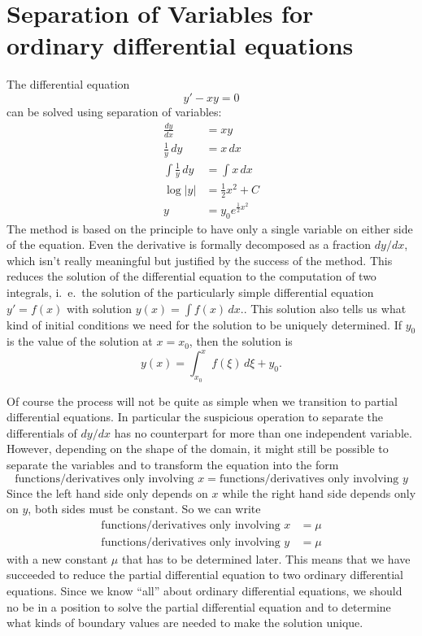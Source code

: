 %
%
%
\section{Separation of Variables for ordinary differential equations}
The differential equation
\begin{equation}
y'-xy=0
\label{separation:ode}
\end{equation}
can be solved using separation of variables:
\begin{align*}
\frac{dy}{dx}&=xy\\
\frac1y\,dy&=x\,dx\\
\int\frac1y\,dy&=\int x\,dx\\
\log|y|&=\frac12x^2+C\\
y&=y_0e^{\frac12x^2}
\end{align*}
The method is based on the principle to have only a single variable
on either side of the equation.
Even the derivative is formally decomposed as a fraction $dy/dx$, which
isn't really meaningful but justified by the success of the method.
This reduces the solution of the differential equation to the computation
of two integrals, i.~e.~the solution of the particularly simple
differential equation $y'=f(x)$ with solution $y(x)=\int f(x)\,dx$..
This solution also tells us what kind of initial conditions we need
for the solution to be uniquely determined.
If $y_0$ is the value of the solution at $x=x_0$, then the solution is
\[
y(x)=\int_{x_0}^xf(\xi)\,d\xi + y_0.
\]

Of course the process will not be quite as simple when we transition
to partial differential equations.
In particular the suspicious operation to separate the differentials
of $dy/dx$ has no counterpart for more than one independent variable.
However, depending on the shape of the domain, it might still be possible
to separate the variables and to transform the equation into the form
\[
\text{functions/derivatives only involving $x$}
=
\text{functions/derivatives only involving $y$}
\]
Since the left hand side only depends on $x$ while the right hand side
depends only on $y$, both sides must be constant.
So we can write
\begin{align*}
\text{functions/derivatives only involving $x$} &= \mu
\\
\text{functions/derivatives only involving $y$} &= \mu
\end{align*}
with a new constant $\mu$ that has to be determined later.
This means that we have succeeded to reduce the partial differential
equation to two ordinary differential equations.
Since we know ``all'' about ordinary differential equations, we should
no be in a position to solve the partial differential equation and
to determine what kinds of boundary values are needed to make the
solution unique.

